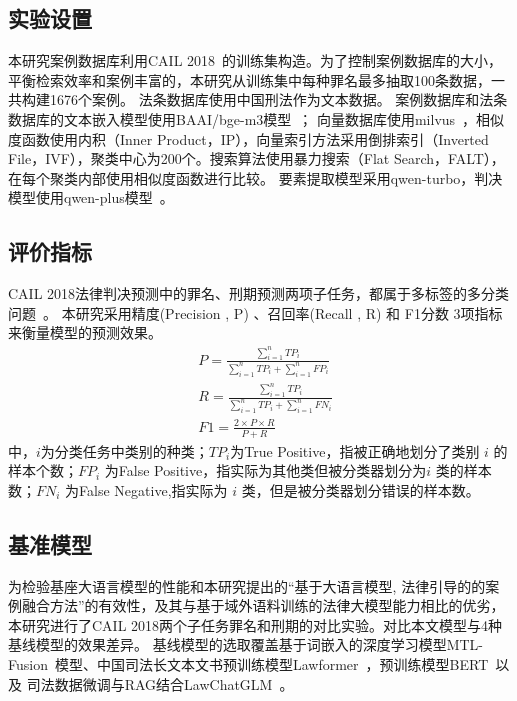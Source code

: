 \subsection{\heiti 实验设置}
本研究案例数据库利用CAIL 2018~\cite{xiao2018cail2018largescalelegaldataset}的训练集构造。为了控制案例数据库的大小，平衡检索效率和案例丰富的，本研究从训练集中每种罪名最多抽取100条数据，一共构建1676个案例。
法条数据库使用中国刑法作为文本数据。
案例数据库和法条数据库的文本嵌入模型使用BAAI/bge-m3模型~\cite{chenBGEM3EmbeddingMultiLingual2024}；
向量数据库使用milvus~\cite{2022manu,2021milvus}，相似度函数使用内积（Inner Product，IP），向量索引方法采用倒排索引（Inverted File，IVF），聚类中心为200个。搜索算法使用暴力搜索（Flat Search，FALT），在每个聚类内部使用相似度函数进行比较。
要素提取模型采用qwen-turbo，判决模型使用qwen-plus模型~\cite{qwenQwen25TechnicalReport2025}。

\subsection{\heiti 评价指标}
CAIL 2018法律判决预测中的罪名、刑期预测两项子任务，都属于多标签的多分类问题~\cite{xiao2018cail2018}。
本研究采用精度(Precision , P) 、召回率(Recall , R) 和 F1分数 3项指标来衡量模型的预测效果。
\begin{eqnarray}
	&P=\frac{\sum_{i=1}^{n}TP_{i}}{\sum_{i=1}^{n}TP_{i}+\sum_{i=1}^{n}FP_{i}}
	\\
	&R=\frac{\sum_{i=1}^{n}TP_{i}}{\sum_{i=1}^{n}TP_{i}+\sum_{i=1}^{n}FN_{i}}
	\\
	&F1=\frac{2\times P\times R}{P+R}
\end{eqnarray}
中，$i$为分类任务中类别的种类；$TP_i$为True Positive，指被正确地划分了类别 $i$ 的样本个数；$FP_i$ 为False Positive，指实际为其他类但被分类器划分为$i$ 类的样本数；$FN_i$ 为False Negative,指实际为 $i$ 类，但是被分类器划分错误的样本数。

\subsection{\heiti 基准模型}
为检验基座大语言模型的性能和本研究提出的“基于大语言模型, 法律引导的的案例融合方法”的有效性，及其与基于域外语料训练的法律大模型能力相比的优劣，本研究进行了CAIL 2018两个子任务罪名和刑期的对比实验。对比本文模型与4种基线模型的效果差异。
基线模型的选取覆盖基于词嵌入的深度学习模型MTL-Fusion~\cite{zhuopeng-etal-2020-multi}模型、中国司法长文本文书预训练模型Lawformer~\cite{xiao2021lawformer}，预训练模型BERT~\cite{fan2022multi}以及 司法数据微调与RAG结合LawChatGLM~\cite{JSJA202505027}。

